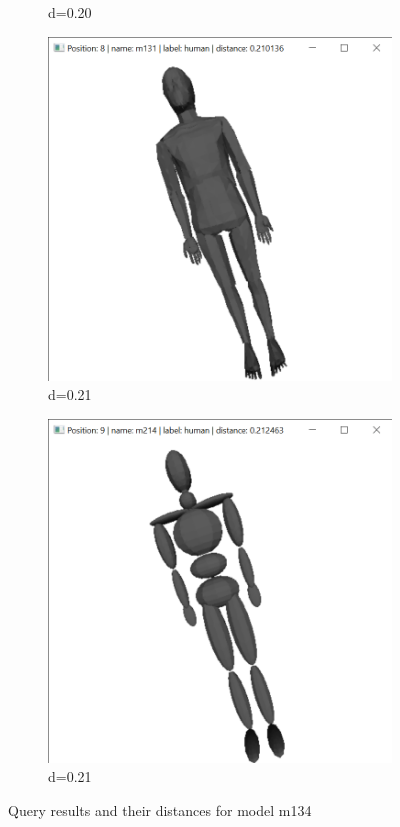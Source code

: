\documentclass{bigdata}
\begin{document}
\begin{figure}[h!]
\begin{subfigure}[b]{0.09\linewidth}
    \caption*{d=0.20}
  \end{subfigure}
  \begin{subfigure}[b]{0.09\linewidth}
    \includegraphics[width=\linewidth]{Pictures/Evaluation/m134/pos8.png}
    \caption*{d=0.21}
  \end{subfigure}
  \begin{subfigure}[b]{0.09\linewidth}
    \includegraphics[width=\linewidth]{Pictures/Evaluation/m134/pos9.png}
    \caption*{d=0.21}
  \end{subfigure}
  \caption{Query results and their distances for model m134}
  \label{fig:bunny}
\end{figure}
\end{document}
